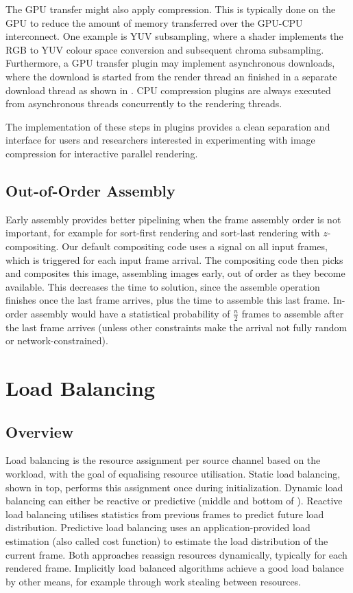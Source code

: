 The GPU transfer might also apply compression. This is typically done on the
GPU to reduce the amount of memory transferred over the GPU-CPU interconnect.
One example is YUV subsampling, where a shader implements the RGB to YUV colour
space conversion and subsequent chroma subsampling. Furthermore, a GPU transfer
plugin may implement asynchronous downloads, where the download is started
from the render thread an finished in a separate download thread as shown in
. CPU compression plugins are always executed from asynchronous
threads concurrently to the rendering threads.

The implementation of these steps in plugins provides a clean separation and
interface for users and researchers interested in experimenting with image
compression for interactive parallel rendering.

\section{Out-of-Order Assembly}\label{sEarlyAss}

Early assembly provides better pipelining when the frame assembly order is not
important, for example for sort-first rendering and sort-last rendering with
$z$-compositing. Our default compositing code uses a signal on all input
frames, which is triggered for each input frame arrival. The compositing code
then picks and composites this image, assembling images early, out of order as
they become available. This decreases the time to solution, since the assemble
operation finishes once the last frame arrives, plus the time to assemble this
last frame. In-order assembly would have a statistical probability of
$\frac{n}{2}$ frames to assemble after the last frame arrives (unless other
constraints make the arrival not fully random or network-constrained).

\chapter{Load Balancing}\label{sLoadBalancing}

\section{Overview}

Load balancing is the resource assignment per source channel based on the
workload, with the goal of equalising resource utilisation. Static load
balancing, shown in  top, performs this assignment once
during initialization. Dynamic load balancing can either be reactive or
predictive (middle and bottom of ). Reactive load balancing
utilises statistics from previous frames to predict future load distribution.
Predictive load balancing uses an application-provided load estimation (also
called cost function) to estimate the load distribution of the current frame.
Both approaches reassign resources dynamically, typically for each rendered
frame. Implicitly load balanced algorithms achieve a good load balance by other
means, for example through work stealing between resources.

